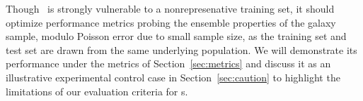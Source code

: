 Though \trainz\ is strongly vulnerable to a nonrepresenative training set, it should optimize performance metrics probing the ensemble properties of the galaxy sample, modulo Poisson error due to small sample size, as the training set and test set are drawn from the same underlying population.
We will demonstrate its performance under the metrics of Section~\ref{sec:metrics} and discuss it as an illustrative experimental control case in Section~\ref{sec:caution} to highlight the limitations of our evaluation criteria for \pzpdf s.
